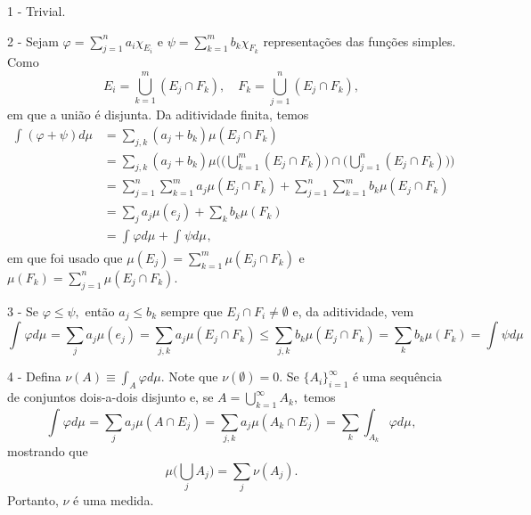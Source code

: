 \documentclass[measure_theory.tex]{subfiles}
\begin{document}
\begin{proof*}
	1 - Trivial.

	2 - Sejam \(\varphi  = \sum\limits_{j=1}^{n}a_{i}\chi_{E_{i}}\) e \(\psi = \sum\limits_{k=1}^{m}b_{k}\chi_{F_{k}}\)  representações das funções simples. Como
	\[
		E_{i} = \bigcup_{k=1}^{m}(E_{j}\cap F_{k}), \quad F_{k} = \bigcup_{j=1}^{n}(E_{j}\cap F_{k}),
	\]
	em que a união é disjunta. Da aditividade finita, temos
	\begin{align*}
		\int_{}(\varphi +\psi) d\mu_{} & = \sum\limits_{j, k}^{}(a_{j} + b_{k})\mu (E_{j}\cap F_{k})                                                                                                   \\
		                               & = \sum\limits_{j, k}^{}(a_{j} + b_{k})\mu \biggl(\biggl(\bigcup_{k=1}^{m}(E_{j}\cap F_{k})\biggr)\cap \biggl(\bigcup_{j=1}^{n}(E_{j}\cap F_{k})\biggr)\biggr) \\
		                               & = \sum\limits_{j=1}^{n}\sum\limits_{k=1}^{m}a_{j}\mu (E_{j}\cap F_{k}) + \sum\limits_{j=1}^{n}\sum\limits_{k=1}^{m}b_{k}\mu (E_{j}\cap F_{k})                 \\
		                               & = \sum\limits_{j}^{}a_{j}\mu (e_{j}) + \sum\limits_{k}^{}b_{k}\mu (F_{k})                                                                                     \\
		                               & = \int_{}\varphi  d\mu_{} + \int_{}\psi d\mu_{},
	\end{align*}
	em que foi usado que \(\mu (E_{j}) = \sum\limits_{k=1}^{m}\mu (E_{j}\cap F_{k})\) e \(\mu (F_{k}) = \sum\limits_{j=1}^{n}\mu (E_{j}\cap F_{k})\).

	3 - Se \(\varphi \leq \psi,\) então \(a_{j}\leq b_{k}\) sempre que \(E_{j}\cap F_{i}\neq\emptyset\) e, da aditividade, vem
	\[
		\int_{}\varphi  d\mu_{} = \sum\limits_{j}^{}a_{j}\mu (e_{j}) = \sum\limits_{j, k}^{}a_{j}\mu (E_{j}\cap F_{k}) \leq \sum\limits_{j, k}^{}b_{k}\mu (E_{j}\cap F_{k}) = \sum\limits_{k}^{}b_{k}\mu (F_{k}) = \int_{}\psi d\mu_{}
	\]

	4 - Defina \(\nu(A)\equiv \int_{A}^{}\varphi d\mu .\) Note que \(\nu(\emptyset )=0.\) Se \(\{A_{i}\}_{i=1}^{\infty}\) é uma sequência de conjuntos dois-a-dois disjunto e, se \(A = \bigcup_{k=1}^{\infty}A_{k},\) temos
	\[
		\int_{}\varphi  d\mu_{} = \sum\limits_{j}^{}a_{j}\mu (A\cap E_{j}) = \sum\limits_{j, k}^{}a_{j}\mu (A_{k}\cap E_{j}) = \sum\limits_{k}^{}\int_{A_{k}}\varphi  d\mu_{},
	\]
	mostrando que
	\[
		\mu \biggl(\bigcup_{j}^{}A_{j}\biggr) = \sum\limits_{j}^{}\nu(A_{j}).
	\]
	Portanto, \(\nu\) é uma medida. \qedsymbol
\end{proof*}
\end{document}
